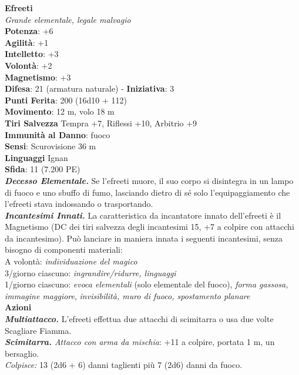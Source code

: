 \begin{multicols}{2}
\medskip\textbf{Efreeti}\\
\emph{Grande elementale, legale malvagio}\\
\textbf{Potenza}: +6\\
\textbf{Agilità}: +1\\
\textbf{Intelletto}: +3\\
\textbf{Volontà}: +2\\
\textbf{Magnetismo}: +3\\
\textbf{Difesa}: 21 (armatura naturale) - \textbf{Iniziativa}: 3\\
\textbf{Punti Ferita}: 200 (16d10 + 112) \\
\textbf{Movimento}: 12 m, volo 18 m\\
\textbf{Tiri Salvezza} Tempra +7, Riflessi +10, Arbitrio +9\\
\textbf{Immunità al Danno}: fuoco\\
\textbf{Sensi}: Scurovisione 36 m\\
\textbf{Linguaggi} Ignan\\
\textbf{Sfida}: 11 (7.200 PE)\smallskip\\
\emph{\textbf{Decesso Elementale.}} Se l'efreeti muore, il suo corpo si disintegra in un lampo di fuoco e uno sbuffo di fumo, lasciando dietro di sé solo l'equipaggiamento che l'efreeti stava indossando o trasportando.\\
\emph{\textbf{Incantesimi Innati.}} La caratteristica da incantatore innato dell'efreeti è il Magnetismo (DC dei tiri salvezza degli incantesimi 15, +7 a colpire con attacchi da incantesimo). Può lanciare in maniera innata i seguenti incantesimi, senza bisogno di componenti materiali:\\
A volontà: \emph{individuazione del magico}\\
3/giorno ciascuno: \emph{ingrandire/ridurre, linguaggi}\\
1/giorno ciascuno: \emph{evoca elementali} (solo elementale del fuoco), \emph{forma gassosa, immagine maggiore}, \emph{invisibilità, muro di fuoco, spostamento planare}\\
\smallskip\textbf{Azioni}\\
\emph{\textbf{Multiattacco.}} L'efreeti effettua due attacchi di scimitarra o usa due volte Scagliare Fiamma.\\
\emph{\textbf{Scimitarra.} Attacco con arma da mischia}: +11 a colpire, portata 1 m, un bersaglio.\\
\emph{Colpisce:} 13 (2d6 + 6) danni taglienti più 7 (2d6) danni da fuoco.\\

\end{multicols}
